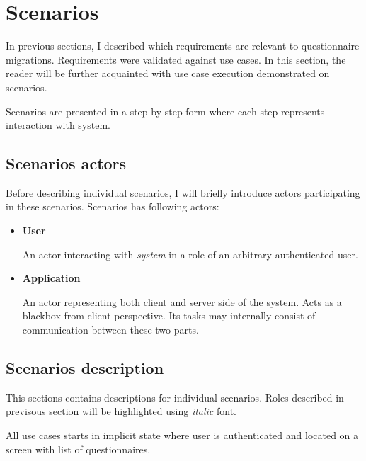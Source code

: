 \section{Scenarios}\label{sec:scenarios}

In previous sections, I described which requirements are relevant to questionnaire migrations.
Requirements were validated against use cases.
In this section, the reader will be further acquainted with use case execution demonstrated on scenarios.

Scenarios are presented in a step-by-step form where each step represents interaction with system.

\subsection{Scenarios actors}\label{sec:scenarios-actors}

Before describing individual scenarios, I will briefly introduce actors participating in these scenarios.
Scenarios has following actors:

\begin{itemize}
    \item \textbf{User}

    An actor interacting with \textit{system} in a role of an arbitrary authenticated user.

    \item \textbf{Application}
    
    An actor representing both client and server side of the system.
    Acts as a blackbox from client perspective.
    Its tasks may internally consist of communication between these two parts.

\end{itemize}

\subsection{Scenarios description}\label{sec:scenarios-description}

This sections contains descriptions for individual scenarios.
Roles described in previsous section will be highlighted using \textit{italic} font.

All use cases starts in implicit state where user is authenticated and located on a screen with list of questionnaires.

